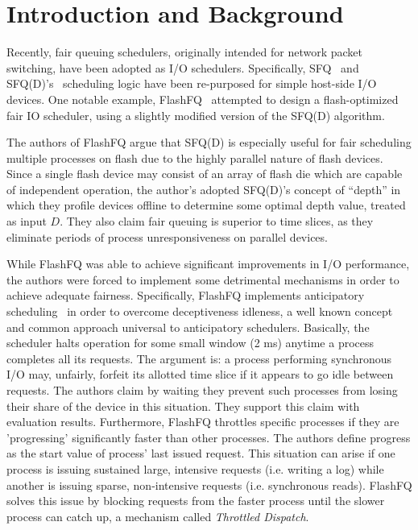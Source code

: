 \section{Introduction and Background}

Recently, fair queuing schedulers, originally intended for network
packet switching, have been adopted as I/O schedulers. Specifically,
SFQ~\cite{SFQ} and SFQ(D)'s~\cite{SFQD} scheduling logic have been
re-purposed for simple host-side I/O devices. One notable example,
FlashFQ~\cite{FlashFQ} attempted to design a flash-optimized fair IO
scheduler, using a slightly modified version of the SFQ(D) algorithm.

The authors of FlashFQ argue that SFQ(D) is especially useful for fair
scheduling multiple processes on flash due to the highly parallel
nature of flash devices. Since a single flash device may consist of
an array of flash die which are capable of independent operation, the
author's adopted SFQ(D)'s concept of ``depth'' in which they profile
devices offline to determine some optimal depth value, treated as
input $D$. They also claim fair queuing is superior to time slices,
as they eliminate periods of process unresponsiveness on parallel
devices.

While FlashFQ was able to achieve significant improvements in I/O
performance, the authors were forced to implement some detrimental
mechanisms in order to achieve adequate fairness. Specifically,
FlashFQ implements anticipatory scheduling~\cite{anticipatory} in
order to overcome deceptiveness idleness, a well known concept and
common approach universal to anticipatory schedulers. Basically, the
scheduler halts operation for some small window (2 ms) anytime a
process completes all its requests. The argument is: a process
performing synchronous I/O may, unfairly, forfeit its allotted time
slice if it appears to go idle between requests. The authors claim by
waiting they prevent such processes from losing their share of the
device in this situation. They support this claim with evaluation
results. Furthermore, FlashFQ throttles specific processes if they are
'progressing' significantly faster than other processes. The authors
define progress as the start value of process' last issued
request. This situation can arise if one process is issuing sustained
large, intensive requests (i.e. writing a log) while another is
issuing sparse, non-intensive requests (i.e. synchronous
reads). FlashFQ solves this issue by blocking requests from the faster
process until the slower process can catch up, a mechanism called
\emph{Throttled Dispatch}.

